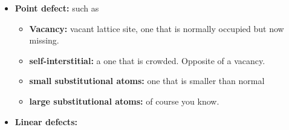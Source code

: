 \documentclass[13]{article}
\begin{document}
\begin{itemize}

	\item \textbf{Point defect:}  such as 
	\begin{itemize}
	
		\item\textbf{ Vacancy:}  vacant lattice site, one that is normally occupied but now missing.
		\item \textbf{self-interstitial:}  a one that is crowded. Opposite of a vacancy.
		\item \textbf{small substitutional atoms:}  one that is smaller than normal
		\item \textbf{large substitutional atoms:}  of course you know.
	\end{itemize}
\item \textbf{Linear defects:}  \begin{itemize}


\end{itemize}
\end{itemize}
\end{document}
